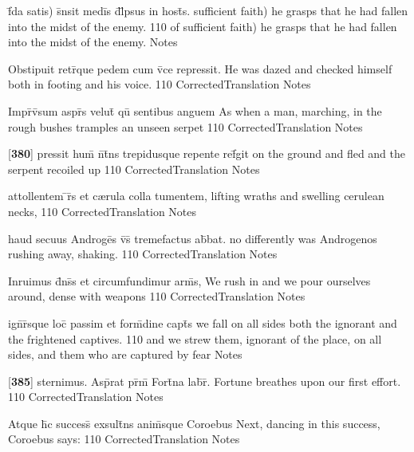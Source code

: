 \latline
  {f\={\macron {\i}}da satis) s\={}nsit medi\={}s d\={}l\={}psus in host\={\macron {\i}}s.}
  { sufficient faith) he grasps that he had fallen into the midst of the enemy. }
  {110}
  { of sufficient faith) he grasps that he had fallen into the midst of the enemy. }
  { Notes }


\latline
  {Obstipuit retr\={}que pedem cum v\={}ce repressit.}
  { He was dazed and checked himself both in footing and his voice. }
  {110}
  { CorrectedTranslation }
  { Notes }


\latline
  {Impr\={}v\={\macron {\i}}sum aspr\={\macron {\i}}s velut\={\macron {\i}} qu\={\macron {\i}} sentibus anguem}
  { As when a man, marching, in the rough bushes tramples an unseen serpet }
  {110}
  { CorrectedTranslation }
  { Notes }


\latline
  {[\textbf{380}] pressit hum\={\macron {\i}} n\={\macron {\i}}t\={}ns trepidusque repente ref\={}git}
  { on the ground and fled and the serpent recoiled up }
  {110}
  { CorrectedTranslation }
  { Notes }


\latline
  {attollentem \={\macron {\i}}r\={}s et c{\ae}rula colla tumentem,}
  { lifting wraths and swelling cerulean necks, }
  {110}
  { CorrectedTranslation }
  { Notes }


\latline
  {haud secuus Androge\={}s v\={\macron {\i}}s\={} tremefactus ab\={\macron {\i}}bat.}
  { no differently was Androgenos rushing away, shaking. }
  {110}
  { CorrectedTranslation }
  { Notes }


\latline
  {Inruimus d\={}ns\={\macron {\i}}s et circumfundimur arm\={\macron {\i}}s,}
  { We rush in and we pour ourselves around, dense with weapons }
  {110}
  { CorrectedTranslation }
  { Notes }


\latline
  {ign\={}r\={}sque loc\={\macron {\i}} passim et form\={\macron {\i}}dine capt\={}s}
  { we fall on all sides both the ignorant and the frightened captives. }
  {110}
  { and we strew them, ignorant of the place, on all sides, and them who are captured by fear }
  { Notes }


\latline
  {[\textbf{385}] sternimus.  Asp\={\macron {\i}}rat pr\={\macron {\i}}m\={} Fort\={}na lab\={}r\={\macron {\i}}.}
  { Fortune breathes upon our first effort. }
  {110}
  { CorrectedTranslation }
  { Notes }


\latline
  {Atque h\={\macron {\i}}c success\={} exsult\={}ns anim\={\macron {\i}}sque Coroebus}
  { Next, dancing in this success, Coroebus says: }
  {110}
  { CorrectedTranslation }
  { Notes }


